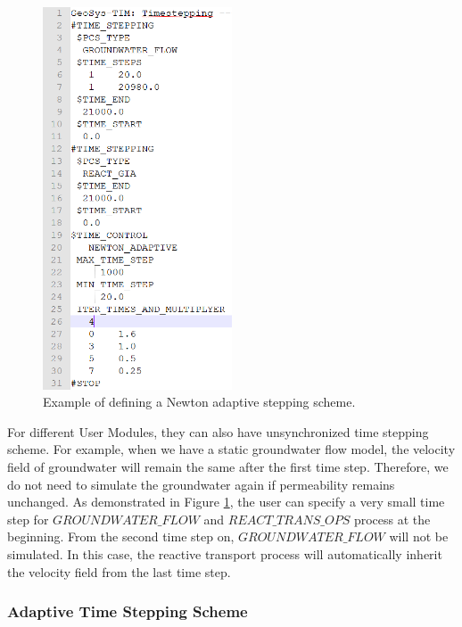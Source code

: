 \begin{figure}
\includegraphics[width=0.5\textwidth]{RT/figs/RT_fig_adapt_tim}
\caption{Example of defining a Newton adaptive stepping scheme. }
\label{fig:RT_fig_adapt_tim}
\end{figure}

For different User Modules, they can also have unsynchronized time stepping scheme. For example, when we have a static groundwater flow model, the velocity field of groundwater will remain the same after the first time step. Therefore, we do not need to simulate the groundwater again if permeability remains unchanged. As demonstrated in Figure \ref{fig:RT_fig_adapt_tim}, the user can specify a very small time step for $GROUNDWATER\_FLOW$ and $REACT\_TRANS\_OPS$ process at the beginning. From the second time step on, $GROUNDWATER\_FLOW$ will not be simulated. In this case, the reactive transport process will automatically inherit the velocity field from the last time step.

\subsubsection{Adaptive Time Stepping Scheme}

